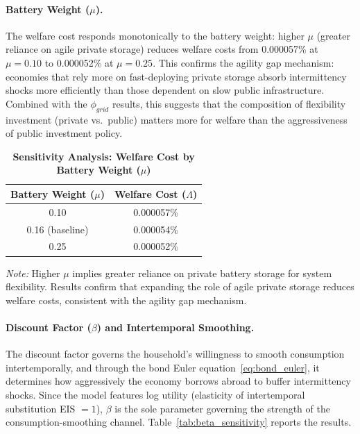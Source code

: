 \documentclass[12pt, a4paper]{article}
\begin{document}
\paragraph{Battery Weight ($\mu$).} The welfare cost responds monotonically to the battery weight: higher $\mu$ (greater reliance on agile private storage) reduces welfare costs from 0.000057\% at $\mu = 0.10$ to 0.000052\% at $\mu = 0.25$. This confirms the agility gap mechanism: economies that rely more on fast-deploying private storage absorb intermittency shocks more efficiently than those dependent on slow public infrastructure. Combined with the $\phi_{grid}$ results, this suggests that the composition of flexibility investment (private vs.\ public) matters more for welfare than the aggressiveness of public investment policy.

\begin{table}[H]
    \centering
    \caption{\textbf{Sensitivity Analysis: Welfare Cost by Battery Weight ($\mu$)}}
    \renewcommand{\arraystretch}{1.3}
    \begin{tabular}{c c}
        \toprule
        \textbf{Battery Weight ($\mu$)} & \textbf{Welfare Cost ($\Lambda$)} \\
        \midrule
        0.10 & 0.000057\% \\
        0.16 (baseline) & 0.000054\% \\
        0.25 & 0.000052\% \\
        \bottomrule
    \end{tabular}
    \vspace{0.2cm}
    \parbox{\textwidth}{\footnotesize \textit{Note:} Higher $\mu$ implies greater reliance on private battery storage for system flexibility. Results confirm that expanding the role of agile private storage reduces welfare costs, consistent with the agility gap mechanism.}
\end{table}

\paragraph{Discount Factor ($\beta$) and Intertemporal Smoothing.} The discount factor governs the household's willingness to smooth consumption intertemporally, and through the bond Euler equation~\eqref{eq:bond_euler}, it determines how aggressively the economy borrows abroad to buffer intermittency shocks. Since the model features log utility (elasticity of intertemporal substitution EIS $= 1$), $\beta$ is the sole parameter governing the strength of the consumption-smoothing channel. Table~\ref{tab:beta_sensitivity} reports the results.
\end{document}
